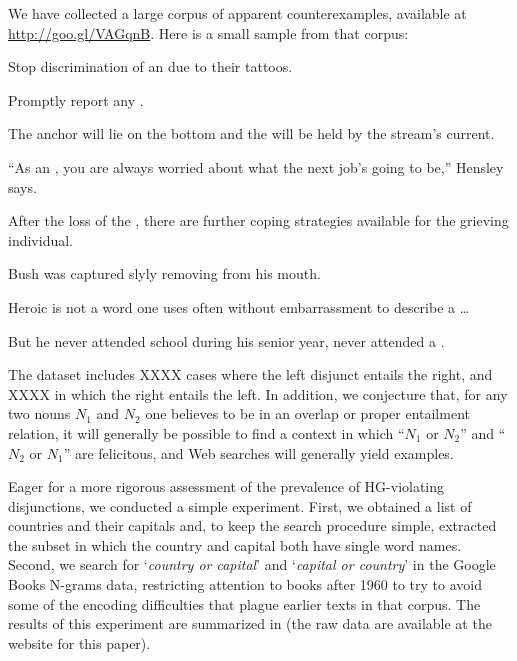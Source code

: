 \documentclass{article}
\begin{document}
We have collected a large corpus of apparent counterexamples,
available at \url{http://goo.gl/VAGqnB}. Here is a small sample from
that corpus:
%
\begin{examples}
\item\label{ourcorpus} 
  \begin{examples}
  \item Stop discrimination of an  due
    to their tattoos.
  \item Promptly report any .
  \item The anchor will lie on the bottom and the  will be held by the stream's current.
  \item ``As an , you are always worried
    about what the next job's going to be,'' Hensley says.
  \item After the loss of the , there are
    further coping strategies available for the grieving individual.
  \item Bush was captured slyly removing 
    from his mouth.
  \item Heroic is not a word one uses often without embarrassment to
    describe a  \ldots
  \item But he never attended school during his senior year, never
    attended a .
  \end{examples}
\end{examples}
%
The dataset includes XXXX cases where the left disjunct entails the
right, and XXXX in which the right entails the left.  In addition, we
conjecture that, for any two nouns $N_{1}$ and $N_{2}$ one believes to
be in an overlap or proper entailment relation, it will generally be
possible to find a context in which ``$N_{1}$ or $N_{2}$'' and
``$N_{2}$ or $N_{1}$'' are felicitous, and Web searches will generally
yield examples.

Eager for a more rigorous assessment of the prevalence of HG-violating
disjunctions, we conducted a simple experiment. First, we obtained a
list of countries and their capitals and, to keep the search procedure
simple, extracted the subset in which the country and capital both
have single word names. Second, we search for `\emph{country or
  capital}' and `\emph{capital or country}' in the Google Books
N-grams data, restricting attention to books after 1960 to try to
avoid some of the encoding difficulties that plague earlier texts in
that corpus. The results of this experiment are summarized in
 (the raw data are available at the website
for this paper).
\end{document}
